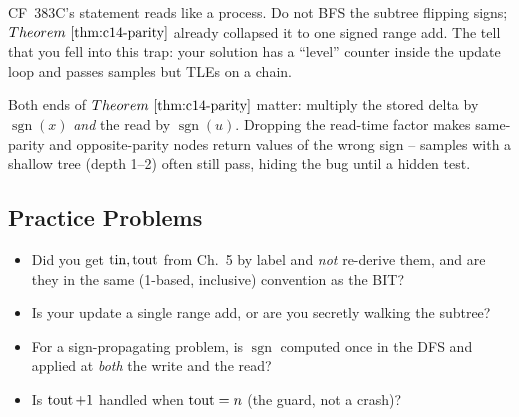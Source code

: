 \begin{warningbox}
CF~383C's statement reads like a process.  Do not BFS the subtree flipping
signs; \(\thmref{c14-parity}\) already collapsed it to one signed range add.
The tell that you fell into this trap: your solution has a ``level'' counter
inside the update loop and passes samples but TLEs on a chain.
\end{warningbox}

\begin{warningbox}
Both ends of \(\thmref{c14-parity}\) matter: multiply the stored delta by
\(\operatorname{sgn}(x)\) \emph{and} the read by \(\operatorname{sgn}(u)\).
Dropping the read-time factor makes same-parity and opposite-parity nodes
return values of the wrong sign -- samples with a shallow tree (depth 1--2)
often still pass, hiding the bug until a hidden test.
\end{warningbox}

\subsection{Practice Problems}

\begin{stuckbox}
\begin{itemize}[nosep,leftmargin=1.4em]
  \item Did you get \(\operatorname{tin},\operatorname{tout}\) from Ch.~5 by label and \emph{not} re-derive
        them, and are they in the same (1-based, inclusive) convention as the BIT?
  \item Is your update a single range add, or are you secretly walking the
        subtree?
  \item For a sign-propagating problem, is \(\operatorname{sgn}\) computed once
        in the DFS and applied at \emph{both} the write and the read?
  \item Is \(\operatorname{tout}+1\) handled when \(\operatorname{tout}=n\) (the guard, not a crash)?
\end{itemize}
\end{stuckbox}

